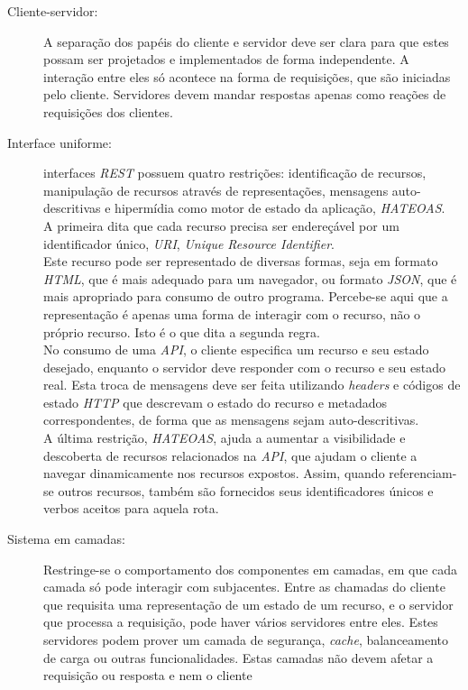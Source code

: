 \begin{description}
\item[Cliente-servidor:] A separação dos papéis do cliente e servidor deve ser clara para 
  que estes possam ser projetados e implementados de forma independente. A interação 
  entre eles só acontece na forma de requisições, que são iniciadas pelo cliente. 
  Servidores devem mandar respostas apenas como reações de requisições dos clientes.
\item[Interface uniforme:] interfaces \emph{REST} possuem quatro  restrições:
identificação de recursos, manipulação de recursos através de representações, 
mensagens auto-descritivas e hipermídia como motor de estado da aplicação, \emph{HATEOAS}.\\
A primeira dita que cada recurso precisa ser endereçável 
por um identificador único, \emph{URI}, \emph{Unique Resource Identifier}.\\
Este 
recurso pode ser representado de diversas formas, seja em formato \emph{HTML}, que é mais adequado para 
um navegador,
ou formato \emph{JSON}, que é mais apropriado para consumo de outro programa. Percebe-se aqui 
que a representação é apenas uma forma de interagir com o 
recurso,  não o próprio recurso. Isto é o que dita a segunda regra. \\
No consumo de uma \emph{API}, o cliente especifica um recurso e seu estado 
desejado, enquanto o servidor deve responder com o recurso e seu estado real. 
Esta troca de mensagens  deve ser feita utilizando \emph{headers} e 
códigos de estado \emph{HTTP} que descrevam o estado 
do recurso e metadados correspondentes, de forma que as mensagens sejam auto-descritivas.\\
A última restrição, \emph{HATEOAS}, ajuda a aumentar a visibilidade e descoberta de recursos 
relacionados na \emph{API}, que ajudam o cliente a navegar dinamicamente nos recursos expostos.
Assim, quando referenciam-se outros recursos, também são fornecidos seus identificadores únicos 
e verbos aceitos para aquela rota.
\item[Sistema em camadas:] Restringe-se o comportamento dos componentes em camadas, em que 
  cada camada só pode interagir com subjacentes. 
  Entre as chamadas do cliente que requisita uma representação de um estado de um recurso, e 
  o servidor que processa a requisição, pode haver vários servidores entre eles. Estes 
  servidores podem prover um camada de segurança, \emph{cache}, balanceamento de carga ou 
  outras funcionalidades. Estas camadas não devem afetar a requisição ou resposta e nem o cliente 

\end{description}
